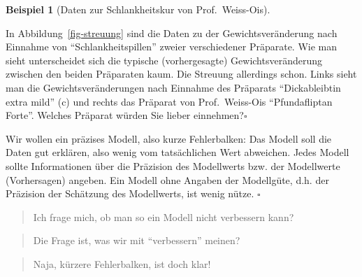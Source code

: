 \documentclass[
  letterpaper,
]{scrbook}
\theoremstyle{definition}
\theoremstyle{definition}
\newtheorem{example}{Beispiel}[chapter]
\theoremstyle{definition}
\theoremstyle{remark}
\begin{document}
\begin{example}[Daten zur Schlankheitskur von
Prof.~Weiss-Ois]\protect\hypertarget{exm-weiss-ois}{}\label{exm-weiss-ois}

In Abbildung~\ref{fig-streuung} sind die Daten zu der
Gewichtsveränderung nach Einnahme von \enquote{Schlankheitspillen}
zweier verschiedener Präparate. Wie man sieht unterscheidet sich die
typische (vorhergesagte) Gewichtsveränderung zwischen den beiden
Präparaten kaum. Die Streuung allerdings schon. Links sieht man die
Gewichtsveränderungen nach Einnahme des Präparats \enquote{Dickableibtin
extra mild} (c) und rechts das Präparat von Prof.~Weiss-Ois
\enquote{Pfundafliptan Forte}. Welches Präparat würden Sie lieber
einnehmen?\(\square\)

\end{example}

\begin{tcolorbox}[enhanced jigsaw, colbacktitle=quarto-callout-important-color!10!white, toptitle=1mm, colframe=quarto-callout-important-color-frame, breakable, toprule=.15mm, bottomrule=.15mm, bottomtitle=1mm, left=2mm, opacitybacktitle=0.6, colback=white, arc=.35mm, coltitle=black, title=\textcolor{quarto-callout-important-color}{\faExclamation}\hspace{0.5em}{Wichtig}, opacityback=0, rightrule=.15mm, leftrule=.75mm, titlerule=0mm]

Wir wollen ein präzises Modell, also kurze Fehlerbalken: Das Modell soll
die Daten gut erklären, also wenig vom tatsächlichen Wert abweichen.
Jedes Modell sollte Informationen über die Präzision des Modellwerts
bzw. der Modellwerte (Vorhersagen) angeben. Ein Modell ohne Angaben der
Modellgüte, d.h. der Präzision der Schätzung des Modellwerts, ist wenig
nütze. \(\square\)

\end{tcolorbox}

\begin{quote}
{} Ich frage mich, ob man so ein Modell nicht verbessern
kann?
\end{quote}

\begin{quote}
{} Die Frage ist, was wir mit \enquote{verbessern}
meinen?
\end{quote}

\begin{quote}
{} Naja, kürzere Fehlerbalken, ist doch klar!
\end{quote}
\end{document}
